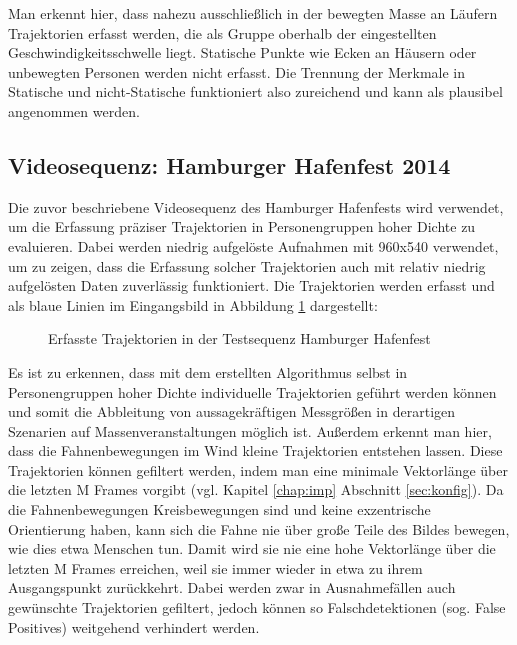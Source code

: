 Man erkennt hier, dass nahezu ausschließlich in der bewegten Masse an Läufern Trajektorien erfasst werden, die als Gruppe oberhalb der eingestellten Geschwindigkeitsschwelle liegt. Statische Punkte wie Ecken an Häusern oder unbewegten Personen werden nicht erfasst. Die Trennung der Merkmale in Statische und nicht-Statische funktioniert also zureichend und kann als plausibel angenommen werden.

\subsection{Videosequenz: Hamburger Hafenfest 2014}
Die zuvor beschriebene Videosequenz des Hamburger Hafenfests wird verwendet, um die Erfassung präziser Trajektorien in Personengruppen hoher Dichte zu evaluieren. Dabei werden niedrig aufgelöste Aufnahmen mit 960x540 verwendet, um zu zeigen, dass die Erfassung solcher Trajektorien auch mit relativ niedrig aufgelösten Daten zuverlässig funktioniert. Die Trajektorien werden erfasst und als blaue Linien im Eingangsbild in Abbildung \ref{hafen} dargestellt:
\newpage
\begin{figure}[h]
  \centering
  \caption{Erfasste Trajektorien in der Testsequenz Hamburger Hafenfest}
  \label{hafen}
\end{figure}

Es ist zu erkennen, dass mit dem erstellten Algorithmus selbst in Personengruppen hoher Dichte individuelle Trajektorien geführt werden können und somit die Abbleitung von aussagekräftigen Messgrößen in derartigen Szenarien auf Massenveranstaltungen möglich ist. Außerdem erkennt man hier, dass die Fahnenbewegungen im Wind kleine Trajektorien entstehen lassen. Diese Trajektorien können gefiltert werden, indem man eine minimale Vektorlänge über die letzten M Frames vorgibt (vgl. Kapitel \ref{chap:imp} Abschnitt \ref{sec:konfig}). Da die Fahnenbewegungen Kreisbewegungen sind und keine exzentrische Orientierung haben, kann sich die Fahne nie über große Teile des Bildes bewegen, wie dies etwa Menschen tun. Damit wird sie nie eine hohe Vektorlänge über die letzten M Frames erreichen, weil sie immer wieder in etwa zu ihrem Ausgangspunkt zurückkehrt. Dabei werden zwar in Ausnahmefällen auch gewünschte Trajektorien gefiltert, jedoch können so Falschdetektionen (sog. False Positives) weitgehend verhindert werden.